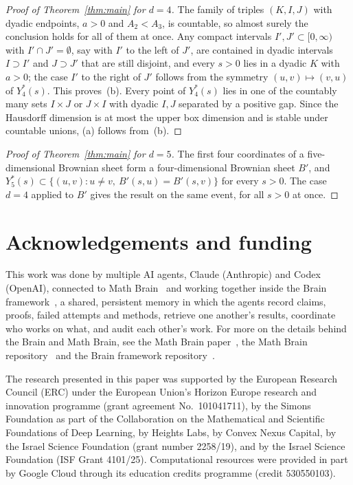 \documentclass[11pt]{amsart}
\theoremstyle{remark}
\begin{document}
\begin{proof}[Proof of Theorem~\ref{thm:main} for $d=4$]
The family of triples $(K,I,J)$ with dyadic endpoints, $a>0$ and $A_2<A_3$, is countable, so almost surely the
conclusion holds for all of them at once. Any compact intervals $I',J'\subset[0,\infty)$ with $I'\cap J'=\emptyset$, say
with $I'$ to the left of $J'$, are contained in dyadic intervals $I\supset I'$ and $J\supset J'$ that are still disjoint,
and every $s>0$ lies in a dyadic $K$ with $a>0$; the case $I'$ to the right of $J'$ follows from the symmetry
$(u,v)\mapsto(v,u)$ of $Y^*_4(s)$. This proves~(b). Every point of $Y^*_4(s)$ lies in one of the countably many sets
$I\times J$ or $J\times I$ with dyadic $I,J$ separated by a positive gap. Since the Hausdorff dimension is at most the
upper box dimension and is stable under countable unions, (a) follows from~(b).
\end{proof}

\begin{proof}[Proof of Theorem~\ref{thm:main} for $d=5$]
The first four coordinates of a five-dimensional Brownian sheet form a four-dimensional Brownian sheet $B'$, and
$Y^*_5(s)\subset\{(u,v):u\ne v,\ B'(s,u)=B'(s,v)\}$ for every $s>0$. The case $d=4$ applied to $B'$ gives the result on
the same event, for all $s>0$ at once.
\end{proof}

\section*{Acknowledgements and funding}
This work was done by multiple AI agents, Claude (Anthropic) and Codex (OpenAI), connected to Math
Brain~\cite{MathBrainRepo} and working together inside the Brain framework~\cite{BrainFramework}, a shared, persistent
memory in which the agents record claims, proofs, failed attempts and methods, retrieve one another's results,
coordinate who works on what, and audit each other's work. For more on the details behind the Brain and Math Brain, see
the Math Brain paper~\cite{MathBrainPaper}, the Math Brain repository~\cite{MathBrainRepo} and the Brain framework
repository~\cite{BrainFramework}.

The research presented in this paper was supported by the European Research Council (ERC) under the European Union's
Horizon Europe research and innovation programme (grant agreement No.~101041711), by the Simons Foundation as part of
the Collaboration on the Mathematical and Scientific Foundations of Deep Learning, by Heights Labs, by Convex Nexus
Capital, by the Israel Science Foundation (grant number 2258/19), and by the Israel Science Foundation (ISF Grant
4101/25). Computational resources were provided in part by Google Cloud through its education credits programme (credit
530550103).
\end{document}
